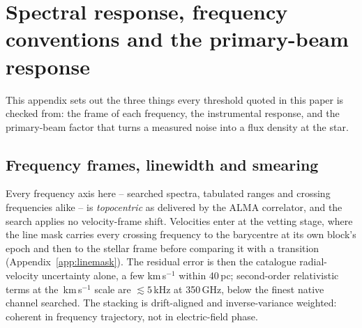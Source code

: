 \section{Spectral response, frequency conventions and the primary-beam
response}
\label{app:conventions}

This appendix sets out the three things every threshold quoted in this paper
is checked from: the frame of each frequency, the instrumental response, and
the primary-beam factor that turns a measured noise into a flux density at the star.


\subsection{Frequency frames, linewidth and smearing}

Every frequency axis here -- searched spectra, tabulated ranges and
crossing frequencies alike -- is \emph{topocentric} as delivered by the
ALMA correlator, and the search applies no velocity-frame shift.
Velocities enter at the vetting stage, where the line mask carries every
crossing frequency to the barycentre at its own block's epoch and then to the
stellar frame before comparing it with a transition
(Appendix~\ref{app:linemask}). The residual error is then the catalogue
radial-velocity uncertainty alone, a few km\,s$^{-1}$ within 40\,pc;
second-order relativistic terms at the \MaskHalfKms\,km\,s$^{-1}$
scale are $\lesssim5$\,kHz at 350\,GHz, below the finest native channel
searched. The stacking is drift-aligned and inverse-variance weighted:
coherent in frequency trajectory, not in electric-field phase.

